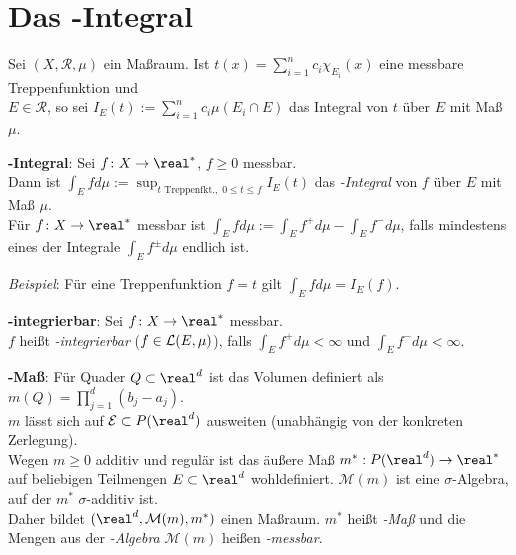\pagebreak

\section{%
    Das -Integral%
}

Sei $(X, \mathcal{R}, \mu)$ ein Maßraum.
Ist $t(x) = \sum_{i=1}^n c_i \chi_{E_i}(x)$ eine messbare Treppenfunktion
und \\
$E \in \mathcal{R}$, so sei $I_E(t) := \sum_{i=1}^n c_i \mu(E_i \cap E)$
das Integral von $t$ über $E$ mit Maß $\mu$.

\textbf{-Integral}:
Sei $f\colon X \rightarrow \real^\ast$, $f \ge 0$ messbar. \\
Dann ist
$\int_E f d\mu := \sup_{t \text{ Treppenfkt.},\; 0 \le t \le f} I_E(t)$
das \emph{-Integral} von $f$ über $E$ mit Maß $\mu$. \\
Für $f\colon X \rightarrow \real^\ast$ messbar ist
$\int_E f d\mu := \int_E f^+ d\mu - \int_E f^- d\mu$, falls mindestens eines
der Integrale $\int_E f^\pm d\mu$ endlich ist.

\emph{Beispiel}: Für eine Treppenfunktion $f = t$ gilt
$\int_E f d\mu = I_E(f)$.

\textbf{-integrierbar}:
Sei $f\colon X \rightarrow \real^\ast$ messbar. \\
$f$ heißt \emph{-integrierbar} ($f \in \mathcal{L}(E, \mu)$), falls
$\int_E f^+ d\mu < \infty$ und $\int_E f^- d\mu < \infty$.

\linie

\textbf{-Maß}:
Für Quader $Q \subset \real^d$ ist das Volumen definiert als
$m(Q) = \prod_{j=1}^d (b_j - a_j)$. \\
$m$ lässt sich auf $\mathcal{E} \subset P(\real^d)$ ausweiten
(unabhängig von der konkreten Zerlegung). \\
Wegen $m \ge 0$ additiv und regulär ist das äußere Maß
$m^\ast: P(\real^d) \rightarrow \real^\ast$ auf
beliebigen Teil\-mengen $E \subset \real^d$ wohldefiniert.
$\mathcal{M}(m)$ ist eine $\sigma$-Algebra, auf der $m^\ast$ $\sigma$-additiv
ist. \\
Daher bildet $(\real^d, \mathcal{M}(m), m^\ast)$ einen Maßraum.
$m^\ast$ heißt \emph{-Maß} und die Mengen aus
der \emph{-Algebra} $\mathcal{M}(m)$
heißen \emph{-messbar}.

\linie

